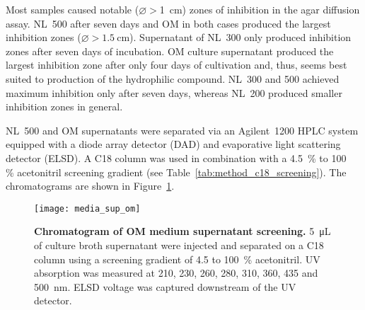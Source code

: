 Most samples caused notable ($\varnothing>$\SI{1}{\centi\meter}) zones of inhibition in the agar diffusion assay.
NL~500 after seven days and OM in both cases produced the largest inhibition zones ($\varnothing > \SI{1.5}{\centi\meter}$).
Supernatant of NL~300 only produced inhibition zones after seven days of incubation.
OM culture supernatant produced the largest inhibition zone after only four days of cultivation and, thus, seems best suited to production of the hydrophilic compound.
NL~300 and 500 achieved maximum inhibition only after seven days, whereas NL~200 produced smaller inhibition zones in general.

NL~500 and OM supernatants were separated via an Agilent~1200 HPLC system equipped with a diode array detector (DAD) and evaporative light scattering detector (ELSD).
A C18 column was used in combination with a 4.5~\% to 100~ \% acetonitril screening gradient (see Table~\ref{tab:method_c18_screening}).
The chromatograms are shown in Figure~\ref{fig:results_medium_screen}.


\begin{figure}[htbp]
	\centering
		\texttt{[image: media\_sup\_om]}
	\caption[Chromatogram of OM medium supernatant screening]{%
		\textbf{Chromatogram of OM medium supernatant screening.} \SI{5}{\micro\liter} of culture broth supernatant were injected and separated on a C18 column using a screening gradient of 4.5 to 100~\% acetonitril. 
		UV absorption was measured at 210, 230, 260, 280, 310, 360, 435 and 500~nm.
		ELSD voltage was captured downstream of the UV detector.
	}
	\label{fig:results_medium_screen}
\end{figure}

